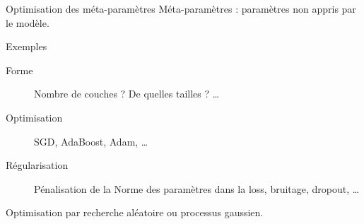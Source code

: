 \begin{frame}{Optimisation des méta-paramètres}
  Méta-paramètres : paramètres \alert{non appris} par le modèle.
  \begin{exampleblock}{Exemples}
  \begin{description}
  \item[Forme] Nombre de couches ? De quelles tailles ? …
  \item [Optimisation] SGD, AdaBoost, Adam, …
  \item [Régularisation] Pénalisation de la Norme des paramètres dans la loss, bruitage, dropout, …
  \end{description}
  \end{exampleblock}
  Optimisation par recherche aléatoire ou processus gaussien.
\end{frame}
